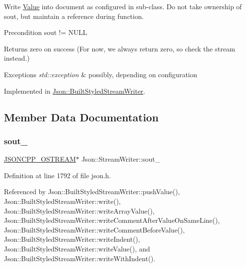 Write \hyperlink{class_json_1_1_value}{Value} into document as configured in sub-\/class. Do not take ownership of sout, but maintain a reference during function. \begin{DoxyPrecond}{Precondition}
sout != N\+U\+LL 
\end{DoxyPrecond}
\begin{DoxyReturn}{Returns}
zero on success (For now, we always return zero, so check the stream instead.) 
\end{DoxyReturn}

\begin{DoxyExceptions}{Exceptions}
{\em std\+::exception} & possibly, depending on configuration \\
\hline
\end{DoxyExceptions}


Implemented in \hyperlink{struct_json_1_1_built_styled_stream_writer_a823cdb1afabb6b0d5f39bcd5a6a6f747}{Json\+::\+Built\+Styled\+Stream\+Writer}.



\subsection{Member Data Documentation}
\mbox{\label{class_json_1_1_stream_writer_a4f5603d4228a9fa46a42cb44e5234d9b}} 
\subsubsection{\texorpdfstring{sout\+\_\+}{sout\_}}
{\footnotesize\ttfamily \hyperlink{json_8h_a37a25be5fca174927780caeb280094ce}{J\+S\+O\+N\+C\+P\+P\+\_\+\+O\+S\+T\+R\+E\+AM}$\ast$ Json\+::\+Stream\+Writer\+::sout\+\_\+\hspace{0.3cm}{\ttfamily [protected]}}



Definition at line 1792 of file json.\+h.



Referenced by Json\+::\+Built\+Styled\+Stream\+Writer\+::push\+Value(), Json\+::\+Built\+Styled\+Stream\+Writer\+::write(), Json\+::\+Built\+Styled\+Stream\+Writer\+::write\+Array\+Value(), Json\+::\+Built\+Styled\+Stream\+Writer\+::write\+Comment\+After\+Value\+On\+Same\+Line(), Json\+::\+Built\+Styled\+Stream\+Writer\+::write\+Comment\+Before\+Value(), Json\+::\+Built\+Styled\+Stream\+Writer\+::write\+Indent(), Json\+::\+Built\+Styled\+Stream\+Writer\+::write\+Value(), and Json\+::\+Built\+Styled\+Stream\+Writer\+::write\+With\+Indent().



